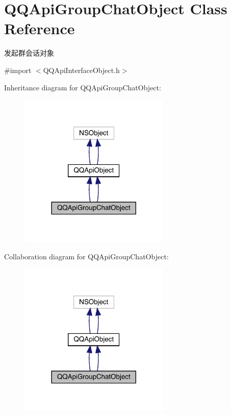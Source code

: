 \hypertarget{interface_q_q_api_group_chat_object}{}\section{Q\+Q\+Api\+Group\+Chat\+Object Class Reference}
\label{interface_q_q_api_group_chat_object}


发起群会话对象  




{\ttfamily \#import $<$Q\+Q\+Api\+Interface\+Object.\+h$>$}



Inheritance diagram for Q\+Q\+Api\+Group\+Chat\+Object\+:\nopagebreak
\begin{figure}[H]
\begin{center}
\leavevmode
\includegraphics[width=204pt]{interface_q_q_api_group_chat_object__inherit__graph}
\end{center}
\end{figure}


Collaboration diagram for Q\+Q\+Api\+Group\+Chat\+Object\+:\nopagebreak
\begin{figure}[H]
\begin{center}
\leavevmode
\includegraphics[width=204pt]{interface_q_q_api_group_chat_object__coll__graph}
\end{center}
\end{figure}
